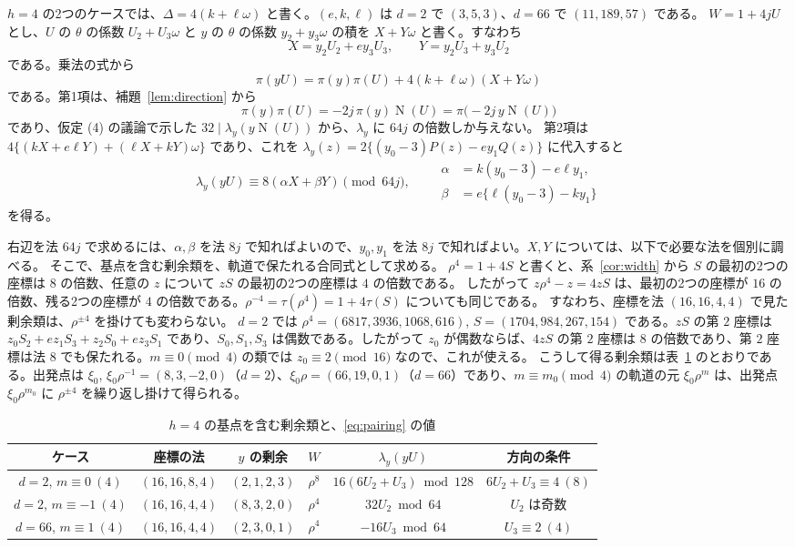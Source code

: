\documentclass[a4paper,11pt]{ltjsarticle}
\theoremstyle{jplain}
\numberwithin{equation}{section}
\numberwithin{table}{section}
\newcommand{\Nm}{\operatorname{N}}
\begin{document}
$h=4$ の2つのケースでは、$\Delta=4(k+\ell\omega)$ と書く。$(e,k,\ell)$ は $d=2$ で $(3,5,3)$、$d=66$ で $(11,189,57)$ である。
$W=1+4jU$ とし、$U$ の $\theta$ の係数 $U_2+U_3\omega$ と $y$ の $\theta$ の係数 $y_2+y_3\omega$ の積を $X+Y\omega$ と書く。すなわち
\[
X=y_2U_2+ey_3U_3,\qquad Y=y_2U_3+y_3U_2
\]
である。乗法の式から
\[
\pi(yU)=\pi(y)\pi(U)+4(k+\ell\omega)(X+Y\omega)
\]
である。第1項は、補題~\ref{lem:direction} から
\[
\pi(y)\pi(U)=-2j\,\pi(y)\Nm(U)=\pi\bigl(-2j\,y\Nm(U)\bigr)
\]
であり、仮定 (4) の議論で示した $32\mid\lambda_y(y\Nm(U))$ から、$\lambda_y$ に $64j$ の倍数しか与えない。
第2項は $4\{(kX+e\ell Y)+(\ell X+kY)\omega\}$ であり、これを $\lambda_y(z)=2\{(y_0-3)P(z)-ey_1Q(z)\}$ に代入すると
\begin{equation}\label{eq:pairing}
\lambda_y(yU)\equiv8(\alpha X+\beta Y)\pmod{64j},\qquad
\begin{aligned}
\alpha&=k(y_0-3)-e\ell y_1,\\
\beta&=e\{\ell(y_0-3)-ky_1\}
\end{aligned}
\end{equation}
を得る。

右辺を法 $64j$ で求めるには、$\alpha,\beta$ を法 $8j$ で知ればよいので、$y_0,y_1$ を法 $8j$ で知ればよい。$X,Y$ については、以下で必要な法を個別に調べる。
そこで、基点を含む剰余類を、軌道で保たれる合同式として求める。
$\rho^4=1+4S$ と書くと、系~\ref{cor:width} から $S$ の最初の2つの座標は $8$ の倍数、任意の $z$ について $zS$ の最初の2つの座標は $4$ の倍数である。
したがって $z\rho^4-z=4zS$ は、最初の2つの座標が $16$ の倍数、残る2つの座標が $4$ の倍数である。$\rho^{-4}=\tau(\rho^4)=1+4\tau(S)$ についても同じである。
すなわち、座標を法 $(16,16,4,4)$ で見た剰余類は、$\rho^{\pm4}$ を掛けても変わらない。
$d=2$ では $\rho^4=(6817,3936,1068,616)$, $S=(1704,984,267,154)$ である。$zS$ の第 $2$ 座標は $z_0S_2+ez_1S_3+z_2S_0+ez_3S_1$ であり、$S_0,S_1,S_3$ は偶数である。したがって $z_0$ が偶数ならば、$4zS$ の第 $2$ 座標は $8$ の倍数であり、第 $2$ 座標は法 $8$ でも保たれる。$m\equiv0\pmod4$ の類では $z_0\equiv2\pmod{16}$ なので、これが使える。
こうして得る剰余類は表~\ref{tab:phases} のとおりである。出発点は $\xi_0$, $\xi_0\rho^{-1}=(8,3,-2,0)$（$d=2$）、$\xi_0\rho=(66,19,0,1)$（$d=66$）であり、$m\equiv m_0\pmod 4$ の軌道の元 $\xi_0\rho^m$ は、出発点 $\xi_0\rho^{m_0}$ に $\rho^{\pm4}$ を繰り返し掛けて得られる。

\begin{table}[htbp]
\centering
\caption{$h=4$ の基点を含む剰余類と、\eqref{eq:pairing} の値}\label{tab:phases}
\small\setlength{\tabcolsep}{3pt}
\begin{tabular}{cccccc}
\toprule
ケース & 座標の法 & $y$ の剰余 & $W$ & $\lambda_y(yU)$ & 方向の条件\\
\midrule
$d=2$, $m\equiv0\ (4)$ & $(16,16,8,4)$ & $(2,1,2,3)$ & $\rho^8$ & $16(6U_2+U_3)\bmod128$ & $6U_2+U_3\equiv4\ (8)$\\
$d=2$, $m\equiv-1\ (4)$ & $(16,16,4,4)$ & $(8,3,2,0)$ & $\rho^4$ & $32U_2\bmod64$ & $U_2$ は奇数\\
$d=66$, $m\equiv1\ (4)$ & $(16,16,4,4)$ & $(2,3,0,1)$ & $\rho^4$ & $-16U_3\bmod64$ & $U_3\equiv2\ (4)$\\
\bottomrule
\end{tabular}
\end{table}
\end{document}
